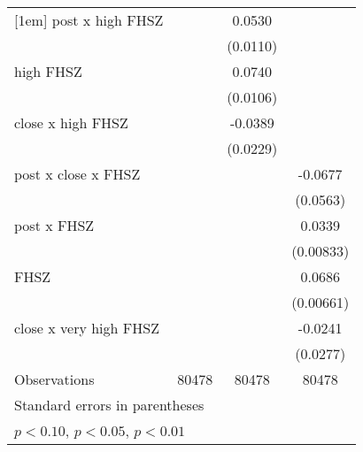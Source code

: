 \begin{table}[htbp]
\begin{tabular}{l*{3}{c}}
[1em]
post x high FHSZ    &                     &      0.0530\sym{***}&                     \\
                    &                     &    (0.0110)         &                     \\
[1em]
high FHSZ           &                     &      0.0740\sym{***}&                     \\
                    &                     &    (0.0106)         &                     \\
[1em]
close x high FHSZ   &                     &     -0.0389         &                     \\
                    &                     &    (0.0229)         &                     \\
[1em]
post x close x FHSZ &                     &                     &     -0.0677         \\
                    &                     &                     &    (0.0563)         \\
[1em]
post x FHSZ         &                     &                     &      0.0339\sym{***}\\
                    &                     &                     &   (0.00833)         \\
[1em]
FHSZ                &                     &                     &      0.0686\sym{***}\\
                    &                     &                     &   (0.00661)         \\
[1em]
close x very high FHSZ&                     &                     &     -0.0241         \\
                    &                     &                     &    (0.0277)         \\
\hline
Observations        &       80478         &       80478         &       80478         \\
\hline\hline
\multicolumn{4}{l}{\footnotesize Standard errors in parentheses}\\
\multicolumn{4}{l}{\footnotesize \sym{*} \(p<0.10\), \sym{**} \(p<0.05\), \sym{***} \(p<0.01\)}\\
\end{tabular}
\end{table}
